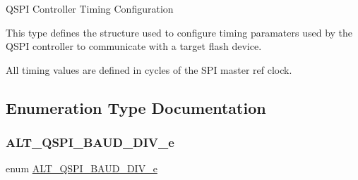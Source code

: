 Q\+S\+PI Controller Timing Configuration

This type defines the structure used to configure timing paramaters used by the Q\+S\+PI controller to communicate with a target flash device.

All timing values are defined in cycles of the S\+PI master ref clock. 

\subsection{Enumeration Type Documentation}
\mbox{\label{group__ALT__QSPI__DEV__CFG_gabea2bac97b47b7da32cf093e97de90e8}} 
\subsubsection{\texorpdfstring{ALT\_QSPI\_BAUD\_DIV\_e}{ALT\_QSPI\_BAUD\_DIV\_e}}
{\footnotesize\ttfamily enum \mbox{\hyperlink{group__ALT__QSPI__DEV__CFG_gabea2bac97b47b7da32cf093e97de90e8}{A\+L\+T\+\_\+\+Q\+S\+P\+I\+\_\+\+B\+A\+U\+D\+\_\+\+D\+I\+V\+\_\+e}}}

